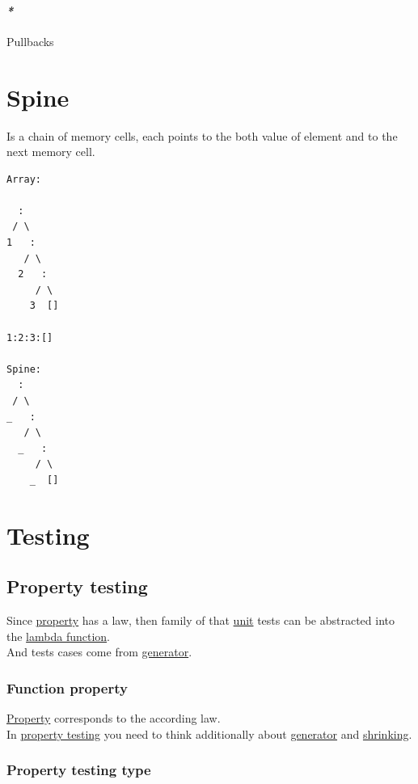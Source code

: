 \documentclass[a4paper,14pt,oneside]{book}
\begin{document}
\subsubsection{\emph{*}}
\label{sec:org89d2110}
\label{orgd6d864f}Pullbacks\\

\chapter{\label{orgb8ede98}Spine}
\label{sec:orgbab4208}
Is a chain of memory cells, each points to the both value of element and to the next memory cell.\\
\begin{verbatim}
Array:

  :
 / \
1   :
   / \
  2   :
     / \
    3  []

1:2:3:[]

Spine:
  :
 / \
_   :
   / \
  _   :
     / \
    _  []

\end{verbatim}

\chapter{\label{org1fc8580}Testing}
\label{sec:orge7d9293}
\section{\label{org9567741}Property testing}
\label{sec:org290478b}
Since \hyperref[orgd3f5c46]{property} has a law, then family of that \hyperref[org7580d7d]{unit} tests can be abstracted into the \hyperref[org64af4b4]{lambda function}.\\
And tests cases come from \hyperref[orgae5c7bf]{generator}.\\

\subsection{\label{org0b4d3e3}Function property}
\label{sec:orgedfcf22}
\hyperref[orgd3f5c46]{Property} corresponds to the according law.\\
In \hyperref[org9567741]{property testing} you need to think additionally about \hyperref[orgae5c7bf]{generator} and \hyperref[org9dc09b3]{shrinking}.\\

\subsection{\label{org6d8ccdf}Property testing type}
\label{sec:org43df4e3}
\end{document}
